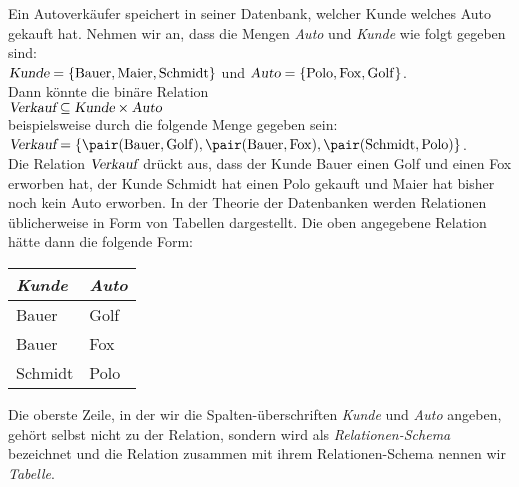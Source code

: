 \example
Ein Autoverk\"{a}ufer speichert in seiner Datenbank, welcher Kunde welches Auto gekauft hat.
Nehmen wir an, dass die Mengen \textsl{Auto} und \textsl{Kunde} wie folgt gegeben sind:
\\[0.2cm]
\hspace*{1.3cm}
$\textsl{Kunde} = \{ \mathrm{Bauer}, \mathrm{Maier}, \mathrm{Schmidt} \}$
\quad und \quad
$\textsl{Auto} = \{ \mathrm{Polo}, \mathrm{Fox}, \mathrm{Golf} \}$.
\\[0.2cm]
Dann k\"{o}nnte die bin\"{a}re Relation 
\\[0.2cm]
\hspace*{1.3cm}
$\textsl{Verkauf} \subseteq \textsl{Kunde} \times \textsl{Auto}$
\\[0.2cm]
beispielsweise durch die folgende Menge gegeben sein:
\\[0.2cm]
\hspace*{1.3cm}
$\textsl{Verkauf} = \{ \pair(\mathrm{Bauer}, \mathrm{Golf}), \pair(\mathrm{Bauer}, \mathrm{Fox}), \pair(\mathrm{Schmidt}, \mathrm{Polo})\}$.
\\[0.2cm]
Die Relation $\textsl{Verkauf}$ dr\"{u}ckt aus, dass der Kunde Bauer einen Golf und einen Fox erworben
hat, der Kunde Schmidt hat einen Polo gekauft und Maier hat bisher noch kein Auto erworben.
In der Theorie der Datenbanken werden Relationen \"{u}blicherweise in Form von Tabellen
dargestellt. Die oben angegebene Relation h\"{a}tte dann die folgende Form:
\begin{center}
  \begin{tabular}[c]{|l|l|}
\hline
\textsl{Kunde} & \textsl{Auto} \\
\hline
\hline
  Bauer   & Golf \\
\hline
  Bauer   & Fox  \\
\hline
  Schmidt & Polo \\
\hline
  \end{tabular}
\end{center}
Die oberste Zeile, in der wir die Spalten-\"{u}berschriften \textsl{Kunde} und \textsl{Auto}
angeben,  geh\"{o}rt selbst nicht zu der Relation, sondern wird als \emph{Relationen-Schema}
bezeichnet und die Relation zusammen mit ihrem Relationen-Schema nennen wir \emph{Tabelle}.  


